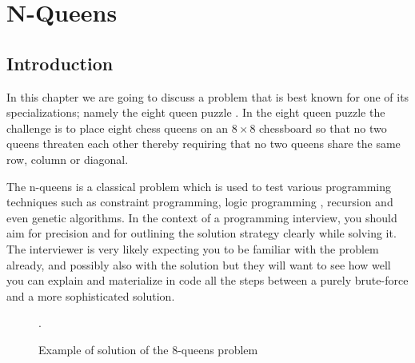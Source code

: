 %



\chapter{N-Queens}
\label{ch:nqueens}
\section*{Introduction}
In this chapter we are going to discuss a problem that is best known for one of its
specializations; namely the eight queen puzzle . In the eight queen puzzle the challenge is to place
eight chess queens on an $8 \times 8$ chessboard so that no two queens threaten each other thereby requiring
 that no two queens share the same row, column or diagonal.

The n-queens is a classical problem which is used to test various programming techniques such as constraint programming, logic
programming , recursion and even genetic algorithms. In the context of a programming interview, you
should aim for precision and for outlining the solution strategy clearly while solving it. The
interviewer is very likely expecting you to be familiar with the problem already, and possibly also with
the solution but they will want to see how well you can explain and materialize in code all the steps
 between a purely brute-force and a more sophisticated solution.

\begin{figure}
	 \centering 
	 \newgame
	 \def\myfen{4q3/6q1/3q4/q7/2q5/7q/5q2/1q6 w - - 0 1}
	 \chessboard[labelbottomformat=\arabic{filelabel}, %
	 showmover=false, %
	 setfen=\myfen] \caption{Example of solution of the $8$-queens problem}.
	  \label{fig:nqueens:chessboard}
\end{figure}


